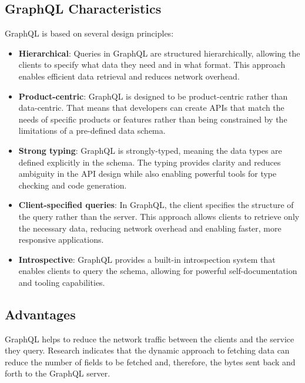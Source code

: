 \subsection{GraphQL Characteristics}\label{subsection:background:graphql:graphql-characteristics}

GraphQL is based on several design principles: \cite{misc:-:background:graphql:graphql-specification}

\begin{itemize}
  \item \textbf{Hierarchical}: Queries in GraphQL are structured hierarchically, allowing the clients to specify what data they need and in what format. This approach enables efficient data retrieval and reduces network overhead.

  \item \textbf{Product-centric}: GraphQL is designed to be product-centric rather than data-centric. That means that developers can create \acp{API} that match the needs of specific products or features rather than being constrained by the limitations of a pre-defined data schema.

  \item \textbf{Strong typing}: GraphQL is strongly-typed, meaning the data types are defined explicitly in the schema. The typing provides clarity and reduces ambiguity in the \ac{API} design while also enabling powerful tools for type checking and code generation.

  \item \textbf{Client-specified queries}: In GraphQL, the client specifies the structure of the query rather than the server. This approach allows clients to retrieve only the necessary data, reducing network overhead and enabling faster, more responsive applications.

  \item \textbf{Introspective}: GraphQL provides a built-in introspection system that enables clients to query the schema, allowing for powerful self-documentation and tooling capabilities.
\end{itemize}

\subsection{Advantages}\label{subsection:background:graphql:graphql-advantages}

GraphQL helps to reduce the network traffic between the clients and the service they query. Research indicates that the dynamic approach to fetching data can reduce the number of fields to be fetched and, therefore, the bytes sent back and forth to the GraphQL server. \cite{inprocessdings:2019:background:graphql:migration-to-graphql}

